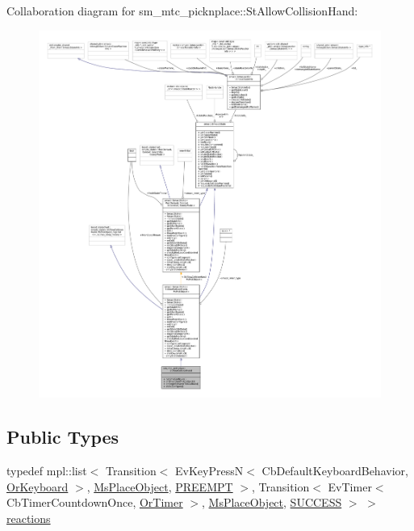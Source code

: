 Collaboration diagram for sm\+\_\+mtc\+\_\+picknplace\+:\+:St\+Allow\+Collision\+Hand\+:
\nopagebreak
\begin{figure}[H]
\begin{center}
\leavevmode
\includegraphics[width=350pt]{structsm__mtc__picknplace_1_1StAllowCollisionHand__coll__graph}
\end{center}
\end{figure}
\subsection*{Public Types}
\begin{DoxyCompactItemize}
\item 
typedef mpl\+::list$<$ Transition$<$ Ev\+Key\+PressN$<$ Cb\+Default\+Keyboard\+Behavior, \hyperlink{classsm__mtc__picknplace_1_1OrKeyboard}{Or\+Keyboard} $>$, \hyperlink{classsm__mtc__picknplace_1_1MsPlaceObject}{Ms\+Place\+Object}, \hyperlink{classPREEMPT}{P\+R\+E\+E\+M\+PT} $>$, Transition$<$ Ev\+Timer$<$ Cb\+Timer\+Countdown\+Once, \hyperlink{classsm__mtc__picknplace_1_1OrTimer}{Or\+Timer} $>$, \hyperlink{classsm__mtc__picknplace_1_1MsPlaceObject}{Ms\+Place\+Object}, \hyperlink{classSUCCESS}{S\+U\+C\+C\+E\+SS} $>$ $>$ \hyperlink{structsm__mtc__picknplace_1_1StAllowCollisionHand_ad22af576c12391c49d7af25689b33478}{reactions}
\end{DoxyCompactItemize}

